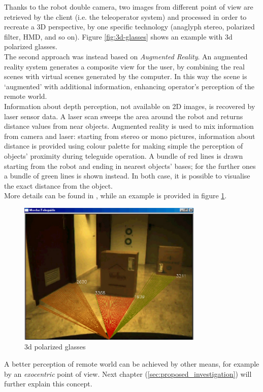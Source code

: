 Thanks to the robot double camera, two images from different point of
view are retrieved by the client (i.e. the teleoperator system) and
processed in order to recreate a 3D perspective, by one specific
technology (anaglyph stereo, polarized filter, HMD, and so on).
Figure \ref{fig:3d-glasses} shows an example with 3d polarized
glasses.
\\
The second approach was instead based on \textit{Augmented Reality}.
An augmented reality system generates a composite view for the user,
by combining the real scenes with virtual scenes generated by the
computer. In this way the scene is `augmented' with additional
information, enhancing operator's perception of the remote world.
\\
Information about depth perception, not available on
2D images, is recovered by laser sensor data. A laser scan sweeps the area
around the robot and returns distance values from near objects. Augmented
reality is used to mix information from camera and laser: starting from
stereo or mono pictures, information about distance is provided using colour
palette for making simple the perception of objects' proximity during
teleguide operation. A bundle of red lines is drawn starting from the robot
and ending in nearest objects' bases; for the further ones a bundle of green
lines is shown instead. In both case, it is possible to visualise the
exact distance from the object.
\\
More details can be found in \cite{morduc:macalusodetommaso}, while an
example is provided in figure \ref{fig:augmented_morduc}.

\begin{figure} [h]
  \begin{center}
    \includegraphics[width=250pt]{img/augmented_morduc.png}
    \caption{3d polarized glasses}
    \label{fig:augmented_morduc}
  \end{center}
\end{figure}

A better perception of remote world can be achieved by other means,
for example by an \textit{exocentric} point of view. Next chapter
(\ref{sec:proposed_investigation}) will further explain this concept.
